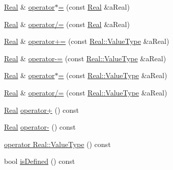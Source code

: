 \begin{DoxyCompactItemize}
\item 
\hyperlink{classlibrary_1_1core_1_1types_1_1_real}{Real} \& \hyperlink{classlibrary_1_1core_1_1types_1_1_real_a7ce9bdd2c145c3684498cac094dc240e}{operator$\ast$=} (const \hyperlink{classlibrary_1_1core_1_1types_1_1_real}{Real} \&a\+Real)
\item 
\hyperlink{classlibrary_1_1core_1_1types_1_1_real}{Real} \& \hyperlink{classlibrary_1_1core_1_1types_1_1_real_adc661a93f109f10500738a77439c975d}{operator/=} (const \hyperlink{classlibrary_1_1core_1_1types_1_1_real}{Real} \&a\+Real)
\item 
\hyperlink{classlibrary_1_1core_1_1types_1_1_real}{Real} \& \hyperlink{classlibrary_1_1core_1_1types_1_1_real_af83f8f060152f4170325c20e521bb219}{operator+=} (const \hyperlink{classlibrary_1_1core_1_1types_1_1_real_a9c5c8826b7e5a8e39544d23fea6c0e1c}{Real\+::\+Value\+Type} \&a\+Real)
\item 
\hyperlink{classlibrary_1_1core_1_1types_1_1_real}{Real} \& \hyperlink{classlibrary_1_1core_1_1types_1_1_real_a6ee8e873f15d642441c23fbc81116a8d}{operator-\/=} (const \hyperlink{classlibrary_1_1core_1_1types_1_1_real_a9c5c8826b7e5a8e39544d23fea6c0e1c}{Real\+::\+Value\+Type} \&a\+Real)
\item 
\hyperlink{classlibrary_1_1core_1_1types_1_1_real}{Real} \& \hyperlink{classlibrary_1_1core_1_1types_1_1_real_ae0bdf12b023e5eafaf18e62c7459ccda}{operator$\ast$=} (const \hyperlink{classlibrary_1_1core_1_1types_1_1_real_a9c5c8826b7e5a8e39544d23fea6c0e1c}{Real\+::\+Value\+Type} \&a\+Real)
\item 
\hyperlink{classlibrary_1_1core_1_1types_1_1_real}{Real} \& \hyperlink{classlibrary_1_1core_1_1types_1_1_real_a6a9a6530460f746c7e7fdbba3b6932fe}{operator/=} (const \hyperlink{classlibrary_1_1core_1_1types_1_1_real_a9c5c8826b7e5a8e39544d23fea6c0e1c}{Real\+::\+Value\+Type} \&a\+Real)
\item 
\hyperlink{classlibrary_1_1core_1_1types_1_1_real}{Real} \hyperlink{classlibrary_1_1core_1_1types_1_1_real_a7f39b72df1d66f354dce558a99dc2da5}{operator+} () const
\item 
\hyperlink{classlibrary_1_1core_1_1types_1_1_real}{Real} \hyperlink{classlibrary_1_1core_1_1types_1_1_real_a7a018943c5110e4023f5e462eed70a25}{operator-\/} () const
\item 
\hyperlink{classlibrary_1_1core_1_1types_1_1_real_a04a25244977883708efaa427e411703b}{operator Real\+::\+Value\+Type} () const
\item 
bool \hyperlink{classlibrary_1_1core_1_1types_1_1_real_a424f4e213c63db76b879c294b9126e37}{is\+Defined} () const

\end{DoxyCompactItemize}
